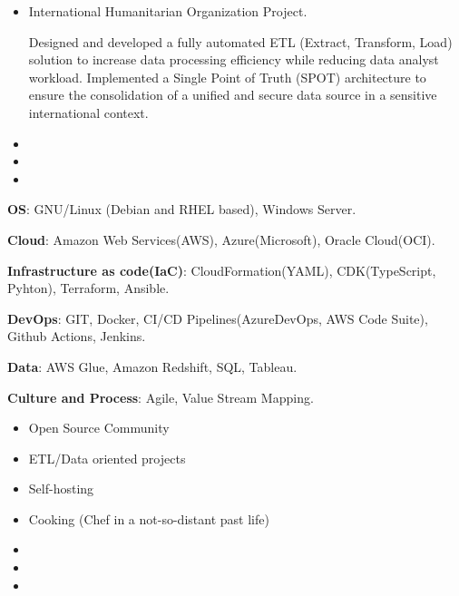 \begin{itemize}
\item International Humanitarian Organization Project.
\smallskip

Designed and developed a fully automated ETL (Extract, Transform, Load) solution to increase data processing efficiency while reducing data analyst workload. Implemented a Single Point of Truth (SPOT) architecture to ensure the consolidation of a unified and secure data source in a sensitive international context.
\end{itemize}
\smallskip
\smallskip

\begin{itemize}
 \item {}
 \item {}
 \item {}
\end{itemize}
\smallskip
\begin{description}
 \item \textbf{OS}: GNU/Linux (Debian and RHEL based), Windows Server.
 \item \textbf{Cloud}: Amazon Web Services(AWS), Azure(Microsoft), Oracle Cloud(OCI).
 \item \textbf{Infrastructure as code(IaC)}: CloudFormation(YAML), CDK(TypeScript, Pyhton), Terraform, Ansible.
 \item \textbf{DevOps}: GIT, Docker, CI/CD Pipelines(AzureDevOps, AWS Code Suite), Github Actions, Jenkins.
 \item \textbf{Data}: AWS Glue, Amazon Redshift, SQL, Tableau.
 \item \textbf{Culture and Process}: Agile, Value Stream Mapping.
\end{description}

\begin{itemize}
\item Open Source Community
\item ETL/Data oriented projects
\end{itemize}
\smallskip
{}
\begin{itemize}
\item Self-hosting
\item Cooking (Chef in a not-so-distant past life)
\end{itemize}


\begin{itemize}
 \item {}
 \item {}
 \item {}
\end{itemize}

